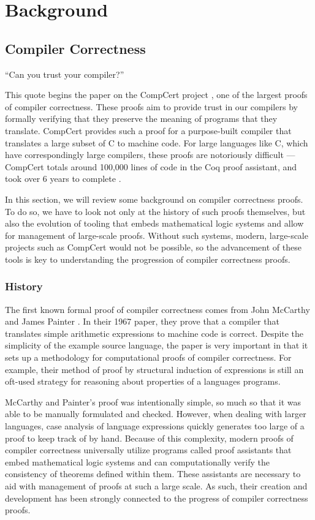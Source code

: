 \chapter{Background}
\section{Compiler Correctness}
``Can you trust your compiler?''

This quote begins the paper on the CompCert project \cite{leroy2019compcert}, one of the largest proofs of compiler correctness. These proofs aim to provide trust in our compilers by formally verifying that they preserve the meaning of programs that they translate. CompCert provides such a proof for a purpose-built compiler that translates a large subset of C to machine code. For large languages like C, which have correspondingly large compilers, these proofs are notoriously difficult --- CompCert totals around 100,000 lines of code in the Coq proof assistant, and took over 6 years to complete \cite{leroy_formal_2009}.

In this section, we will review some background on compiler correctness proofs. To do so, we have to look not only at the history of such proofs themselves, but also the evolution of tooling that embeds mathematical logic systems and allow for management of large-scale proofs. Without such systems, modern, large-scale projects such as CompCert would not be possible, so the advancement of these tools is key to understanding the progression of compiler correctness proofs. 

\subsection{History}
The first known formal proof of compiler correctness comes from John McCarthy and James Painter \cite{mccarthy_correctness_1967}. In their 1967 paper, they prove that a compiler that translates simple arithmetic expressions to machine code is correct. Despite the simplicity of the example source language, the paper is very important in that it sets up a methodology for computational proofs of compiler correctness. For example, their method of proof by structural induction of expressions is still an oft-used strategy for reasoning about properties of a languages programs.

McCarthy and Painter's proof was intentionally simple, so much so that it was able to be manually formulated and checked. However, when dealing with larger languages, case analysis of language expressions quickly generates too large of a proof to keep track of by hand. Because of this complexity, modern proofs of compiler correctness universally utilize programs called proof assistants that embed mathematical logic systems and can computationally verify the consistency of theorems defined within them. These assistants are necessary to aid with management of proofs at such a large scale. As such, their creation and development has been strongly connected to the progress of compiler correctness proofs.

